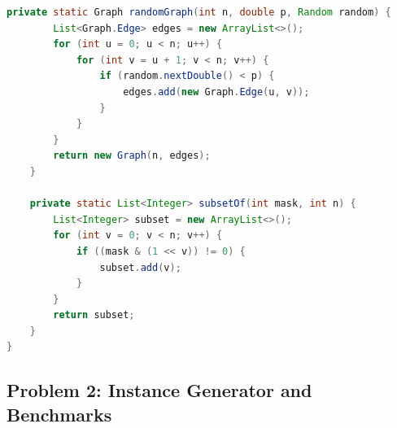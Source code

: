 \documentclass[conference]{IEEEtran}
\theoremstyle{definition}
\theoremstyle{remark}
\begin{document}
\begin{lstlisting}[style=code,language=Java]
    private static Graph randomGraph(int n, double p, Random random) {
        List<Graph.Edge> edges = new ArrayList<>();
        for (int u = 0; u < n; u++) {
            for (int v = u + 1; v < n; v++) {
                if (random.nextDouble() < p) {
                    edges.add(new Graph.Edge(u, v));
                }
            }
        }
        return new Graph(n, edges);
    }

    private static List<Integer> subsetOf(int mask, int n) {
        List<Integer> subset = new ArrayList<>();
        for (int v = 0; v < n; v++) {
            if ((mask & (1 << v)) != 0) {
                subset.add(v);
            }
        }
        return subset;
    }
}
\end{lstlisting}


\subsection{Problem 2: Instance Generator and Benchmarks}
\end{document}
